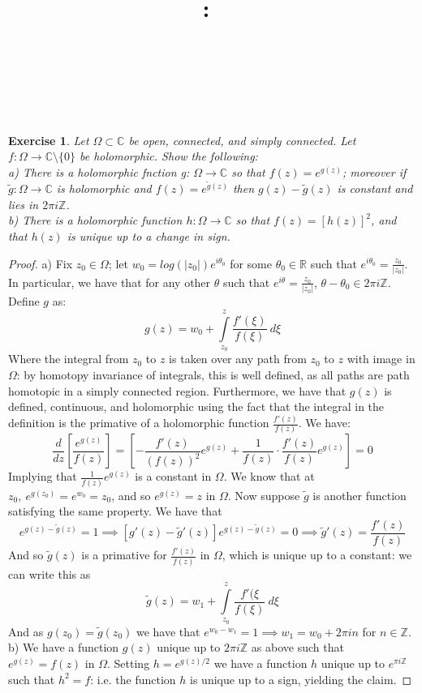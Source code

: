 \documentclass{article}
\title{
    \vspace{2in}
    \textmd{\textbf{\hmwkClass:\ \hmwkTitle}}\\
    \vspace{0.1in}
    \textmd{\hmwkDueDate} \\
    \vspace{0.2in}\large{\textit{\hmwkClassInstructor\  }}
    \vspace{2in}
}
\author{\hmwkAuthorName}
\date{}
\newcommand{\bb}[1]{\mathbb{#1}}
\newtheorem{exercise}{Exercise}
\begin{document}
\maketitle
\newpage
\begin{exercise}
  Let $\Omega \subset \bb{C}$ be open, connected, and simply connected. Let $f: \Omega \to \bb{C} \setminus \{0\}$ be holomorphic. Show the following:\\
  a) There is a holomorphic fnction g: $\Omega \to \bb{C}$ so that $f(z) = e^{g(z)}$; moreover if $\widetilde g: \Omega \to \bb{C}$ is holomorphic and $f(z) = e^{\widetilde g(z)}$ then $g(z) - \widetilde g(z)$ is constant and lies in $2\pi i \bb{Z}$. \\
  b) There is a holomorphic function $h: \Omega \to \bb{C}$ so that $f(z) = [h(z)]^{2}$, and that $h(z)$ is unique up to a change in sign. 
\end{exercise}
\begin{proof}
  a) Fix $z_{0} \in \Omega$; let $w_{0} = log(|z_{0}|)e^{i \theta_{0}}$ for some $\theta_{0} \in \bb{R}$ such that $e^{i \theta_{0}} = \frac{z_{0}}{|z_{0}|}$. In particular, we have that for any other $\theta$ such that $e^{i \theta} = \frac{z_{0}}{|z_{0}|}$, $\theta - \theta_{0} \in 2 \pi i \bb{Z}$. Define $g$ as:
  \[ g(z) = w_{0} + \int\limits_{z_{0}}^{z} \frac{f'(\xi)}{f(\xi)} \ d\xi \]
  Where the integral from $z_{0}$ to $z$ is taken over any path from $z_{0}$ to $z$ with image in $\Omega$: by homotopy invariance of integrals, this is well defined, as all paths are path homotopic in a simply connected region. Furthermore, we have that $g(z)$ is defined, continuous, and holomorphic using the fact that the integral in the definition is the primative of a holomorphic function $\frac{f'(z)}{f(z)}$. We have: 
  \[
    \frac{d}{dz}\left[\frac{e^{g(z)}}{f(z)}\right] = \left[-\frac{f'(z)}{(f(z))^{2}}e^{g(z)} + \frac{1}{f(z)}\cdot\frac{f'(z)}{f(z)}e^{g(z)}\right] = 0
  \]
  Implying that $\frac{1}{f(z)} e^{g(z)}$ is a constant in $\Omega$. We know that at $z_{0}, \ e^{g(z_{0})} = e^{w_{0}} = z_{0}$, and so $e^{g(z)} = z$ in $\Omega$. Now suppose $\widetilde g$ is another function satisfying the same property. We have that \[e^{g(z) - \widetilde g(z)} = 1 \implies [g'(z) - \widetilde g'(z)]e^{g(z) - \widetilde g(z)} = 0 \implies \widetilde g'(z) = \frac{f'(z)}{f(z)}\]
  And so $\widetilde g(z)$ is a primative for $\frac{f'(z)}{f(z)}$ in $\Omega$, which is unique up to a constant: we can write this as
  \[\widetilde g(z) = w_{1} + \int\limits_{z_{0}}^{z}\frac{f'(\xi}{f(\xi)} \ d\xi\]
  And as $g(z_{0}) = \widetilde g(z_{0})$ we have that $ e^{w_{0} - w_{1}}=  1 \implies w_{1} = w_{0} + 2\pi i n  $ for $n \in \bb{Z}$. \\

  b)  We have a function $g(z)$ unique up to $2\pi i\bb{Z}$ as above such that $e^{g(z)} = f(z)$ in $\Omega$. Setting $h = e^{g(z)/2}$ we have a function $h$ unique up to $e^{\pi i \bb{Z}}$ such that $h^{2} = f$: i.e. the function $h$ is unique up to a sign, yielding the claim.  
\end{proof}
\end{document}

